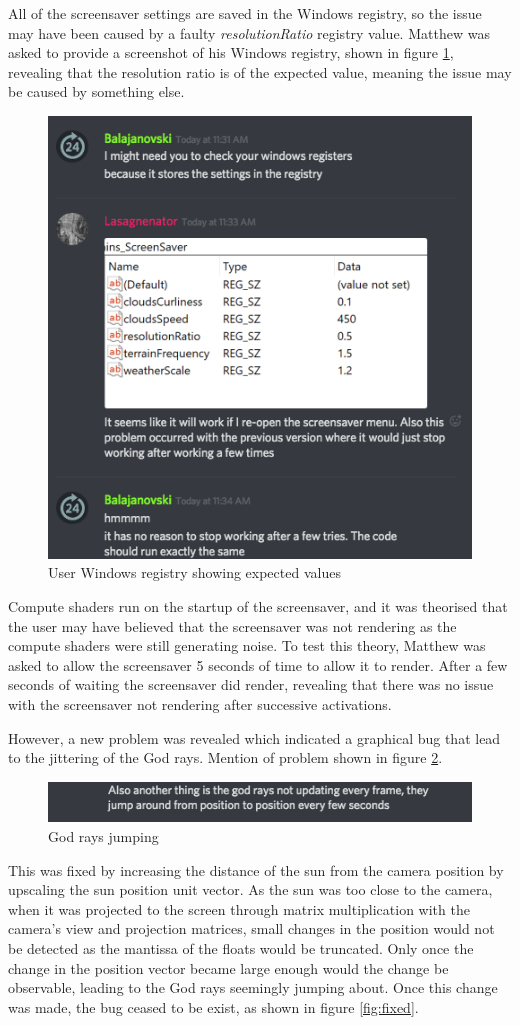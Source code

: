 \documentclass[10pt, openany]{book}
\begin{document}
All of the screensaver settings are saved in the Windows registry, so the issue may have been caused by a faulty \textit{resolutionRatio} registry value. Matthew was asked to provide a screenshot of his Windows registry, shown in figure \ref{fig:registry}, revealing that the resolution ratio is of the expected value, meaning the issue may be caused by something else.

\begin{figure}[H]
	\centering
	\includegraphics[width=0.5\linewidth]{testing2}
	\caption{User Windows registry showing expected values}
	\label{fig:registry}
\end{figure}

Compute shaders run on the startup of the screensaver, and it was theorised that the user may have believed that the screensaver was not rendering as the compute shaders were still generating noise. To test this theory, Matthew was asked to allow the screensaver 5 seconds of time to allow it to render. After a few seconds of waiting the screensaver did render, revealing that there was no issue with the screensaver not rendering after successive activations.

However, a new problem was revealed which indicated a graphical bug that lead to the jittering of the God rays. Mention of problem shown in figure \ref{fig:broken-rays}.

\begin{figure}[H]
	\centering
	\includegraphics[width=0.5\linewidth]{testing3}
	\caption{God rays jumping}
	\label{fig:broken-rays}
\end{figure}

This was fixed by increasing the distance of the sun from the camera position by upscaling the sun position unit vector. As the sun was too close to the camera, when it was projected to the screen through matrix multiplication with the camera's view and projection matrices, small changes in the position would not be detected as the mantissa of the floats would be truncated. Only once the change in the position vector became large enough would the change be observable, leading to the God rays seemingly jumping about. Once this change was made, the bug ceased to be exist, as shown in figure \ref{fig:fixed}.
\end{document}
